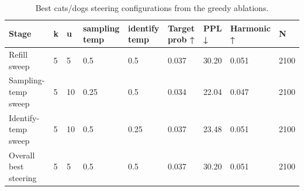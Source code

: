 \begin{table}[t]
\centering
\small
\begin{tabular}{lllllllll}
\toprule
Stage & k & u & sampling temp & identify temp & Target prob ↑ & PPL ↓ & Harmonic ↑ & N \\
\midrule
Refill sweep & 5 & 5 & 0.5 & 0.5 & 0.037 & 30.20 & 0.051 & 2100 \\
Sampling-temp sweep & 5 & 10 & 0.25 & 0.5 & 0.034 & 22.04 & 0.047 & 2100 \\
Identify-temp sweep & 5 & 10 & 0.5 & 0.25 & 0.037 & 23.48 & 0.051 & 2100 \\
Overall best steering & 5 & 5 & 0.5 & 0.5 & 0.037 & 30.20 & 0.051 & 2100 \\
\bottomrule
\end{tabular}
\caption{Best cats/dogs steering configurations from the greedy ablations.}
\label{tab:best-steering}
\end{table}
